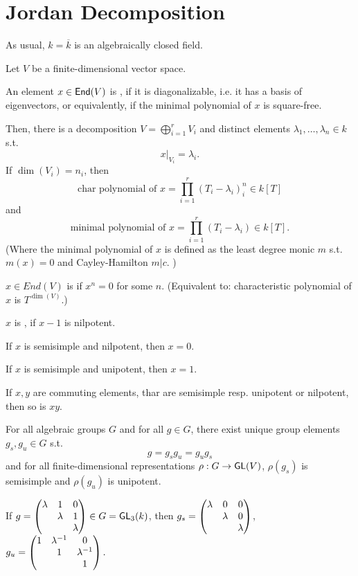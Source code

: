 \section{Jordan Decomposition}
As usual, $k = \overline{k}$ is an algebraically closed field.
\begin{definition}
	Let $V$ be a finite-dimensional vector space.
	
	An element $x \in \textsf{End}(V)$ is , if it is diagonalizable, i.e. it has a basis of eigenvectors, or equivalently, if the minimal polynomial of $x$ is square-free.
	
	Then, there is a decomposition $V = \bigoplus_{i=1}^r V_i$ and distinct elements $\lambda_1, \ldots, \lambda_n \in k$ s.t.
	\[ x|_{V_i} = \lambda_i. \]
	If $\dim(V_i)= n_i$, then
	\[ \text{char polynomial of }x = \prod_{i=1}^r (T_i - \lambda_i)^n_i \in k[T] \]
	and
		\[ \text{minimal polynomial of }x = \prod_{i=1}^r (T_i - \lambda_i) \in k[T]. \]
		(Where the minimal polynomial of $x$ is defined as the least degree monic $m$ s.t. $m(x) = 0$ and Cayley-Hamilton $m | c$. )
\end{definition}

\begin{definition}
	$x \in End(V)$ is  if $x^n = 0$ for some $n$. (Equivalent to: characteristic polynomial of $x$ is $T^{\dim(V)}$.)
	
	$x$ is , if $x -1$ is nilpotent.
\end{definition}

\begin{lemma}
	If $x$ is semisimple and nilpotent, then $x = 0$.
	
	If $x$ is semisimple and unipotent, then $x = 1$.
\end{lemma}
\begin{lemma}
	If $x,y$ are commuting elements, thar are semisimple resp. unipotent or nilpotent, then so is $xy$.
\end{lemma}


\begin{theorem}[Goal]
For all algebraic groups $G$ and for all $g \in G$, there exist unique group elements $g_s, g_u \in G$ s.t.
\[g = g_s g_u = g_ug_s\]
and
for all finite-dimensional representations  $\rho : G \overset{}{\rightarrow} \textsf{GL}(V)$, $\rho(g_s)$ is semisimple and $\rho(g_u)$ is unipotent.
\end{theorem}

\begin{example}
If	$g = \left(\begin{matrix}
	\lambda & 1 & 0 \\
	& \lambda & 1 \\
	& & \lambda
	\end{matrix}\right) \in G = \textsf{GL}_3(k)$, then $g_s = \left(\begin{matrix}
	\lambda & 0 & 0 \\
	& \lambda & 0 \\
	& & \lambda
	\end{matrix}\right)$, $g_u = \left(\begin{matrix}
	1 & \lambda^{-1} & 0 \\
	& 1 & \lambda^{-1} \\
	& & 1
	\end{matrix}\right). $
\end{example}